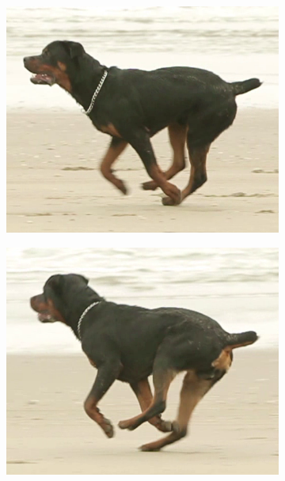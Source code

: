     \begin{figure}[H]
        \centering
        \begin{subfigure}{0.33\textwidth}
        \centering
            \includegraphics[width=1\linewidth]{input/66}
        \end{subfigure}%
        \begin{subfigure}{0.33\textwidth}
        \centering
            \includegraphics[width=1\linewidth]{input/167}
        \end{subfigure}%
        \begin{subfigure}{0.33\textwidth}

\end{subfigure}
\end{figure}
